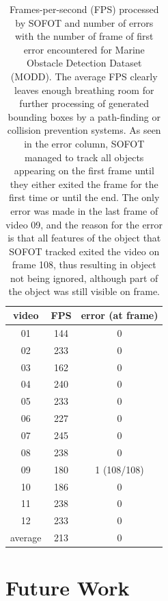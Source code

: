 \documentclass[10pt,twocolumn,letterpaper]{article}
\begin{document}
\begin{table}
   \centering
   \begin{tabular}{c|c|c}
      \textbf{video} & \textbf{FPS} & \textbf{error (at frame)}\\\hline
      01 & 144 & 0\\
      02 & 233 & 0\\
      03 & 162 & 0\\
      04 & 240 & 0\\
      05 & 233 & 0\\
      06 & 227 & 0\\
      07 & 245 & 0\\
      08 & 238 & 0\\
      09 & 180 & 1 (108/108)\\
      10 & 186 & 0\\
      11 & 238 & 0\\
      12 & 233 & 0\\\hline
      average & 213 & 0
   \end{tabular}
   \caption{Frames-per-second (FPS) processed by SOFOT and number of errors with the number of
   frame of first error encountered for Marine Obstacle Detection Dataset (MODD). The average
   FPS clearly leaves enough breathing room for further processing of generated bounding boxes
   by a path-finding or collision prevention systems. As seen in the error column, SOFOT managed
   to track all objects appearing on the first frame until they either exited the frame for the first
   time or until the end. The only error was made in the last frame of video 09, and the reason
   for the error is that all features of the object that SOFOT tracked exited the video on frame 108,
   thus resulting in object not being ignored, although part of the object was still visible on frame.}
   \label{tab:results}
\end{table}



\section{Future Work}\label{sec:future_work}
\end{document}
